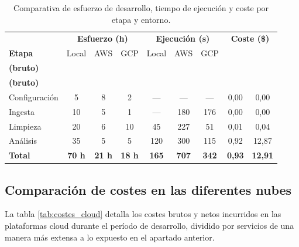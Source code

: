 \begin{table}[htbp]
	\centering
	\footnotesize
	\setlength{\tabcolsep}{3pt}
	\renewcommand{\arraystretch}{1.2}
	\begin{tabular}{lcccccccc}
		\hline
		& \multicolumn{3}{c}{\textbf{Esfuerzo (h)}} & \multicolumn{3}{c}{\textbf{Ejecución (s)}} & \multicolumn{2}{c}{\textbf{Coste (\$)}} \\
		\textbf{Etapa} & Local & AWS & GCP & Local & AWS & GCP & \shortstack{\textbf{AWS}\\\textbf{(bruto)}} & \shortstack{\textbf{GCP}\\\textbf{(bruto)}} \\
		\hline
		Configuración & 5 & 8 & 2 & --- & --- & --- & 0,00 & 0,00 \\
		Ingesta & 10 & 5 & 1 & --- & 180 & 176 & 0,00 & 0,00 \\
		Limpieza & 20 & 6 & 10 & 45 & 227 & 51 & 0,01 & 0,04 \\
		Análisis & 35 & 5 & 5 & 120 & 300 & 115 & 0,92 & 12,87 \\
		\hline
		\textbf{Total} & \textbf{70 h} & \textbf{21 h} & \textbf{18 h} & \textbf{165} & \textbf{707} & \textbf{342} & \textbf{0,93} & \textbf{12,91} \\
		\hline
	\end{tabular}
	\caption{Comparativa de esfuerzo de desarrollo, tiempo de ejecución y coste por etapa y entorno.}
	\label{tab:esfuerzo_plataforma}
\end{table}


\subsection{Comparación de costes en las diferentes nubes}
\label{subsec:Costes_cloud}

La tabla \ref{tab:costes_cloud} detalla los costes brutos y netos incurridos en las plataformas cloud durante el período de desarrollo, dividido por servicios de una manera más extensa a lo expuesto en el apartado anterior.

